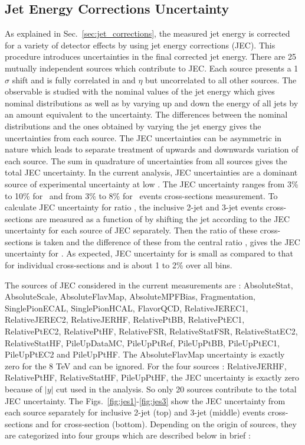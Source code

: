 \subsection{Jet Energy Corrections Uncertainty}
\label{sec:jecs_unc}
As explained in Sec.~\ref{sec:jet_corrections}, the measured jet energy is corrected for a variety of detector effects by using jet energy corrections (JEC). This procedure introduces uncertainties in the final corrected jet energy. There are 25 mutually independent sources which contribute to JEC. Each source presents a 1$\sigma$ shift and is fully correlated in \pt and $\eta$ but uncorrelated to all other sources. The observable is studied with the nominal values of the jet energy which gives nominal distributions as well as by varying up and down the energy of all jets by an amount equivalent to the uncertainty. The differences between the nominal distributions and the ones obtained by varying the jet energy gives the uncertainties from each source. The JEC uncertainties can be asymmetric in nature which leads to separate treatment of upwards and downwards variation of each source. The sum in quadrature of uncertainties from all sources gives the total JEC uncertainty. In the current analysis, JEC uncertainties are a dominant source of experimental uncertainty at low \httwo. The JEC uncertainty ranges from 3\% to 10\% for \njt~and from 3\% to 8\% for \njth~events cross-sections measurement. To calculate JEC uncertainty for ratio \rations, the inclusive 2-jet and 3-jet events cross-sections are measured as a function of \httwo by shifting the jet \pt according to the JEC uncertainty for each source of JEC separately. Then the ratio of these cross-sections is taken and the difference of these from the central ratio \rations, gives the JEC uncertainty for \ratio. As expected, JEC uncertainty for \ratio is small as compared to that for individual cross-sections and is about 1 to 2\% over all \httwo bins.

 The sources of JEC considered in the current measurements are : AbsoluteStat, AbsoluteScale, AbsoluteFlavMap, AbsoluteMPFBias, Fragmentation, SinglePionECAL, SinglePionHCAL, FlavorQCD, RelativeJEREC1, RelativeJEREC2, RelativeJERHF, RelativePtBB, RelativePtEC1, RelativePtEC2, RelativePtHF, RelativeFSR, RelativeStatFSR, RelativeStatEC2, RelativeStatHF, PileUpDataMC, PileUpPtRef, PileUpPtBB, PileUpPtEC1, PileUpPtEC2 and PileUpPtHF. The AbsoluteFlavMap uncertainty is exactly zero for the 8 TeV and can be ignored. For the four sources : RelativeJERHF, RelativePtHF, RelativeStatHF, PileUpPtHF, the JEC uncertainty is exactly zero because of $|y|$  cut used in the analysis. So only 20 sources contribute to the total JEC uncertainty. The Figs.~\ref{fig:jes1}-\ref{fig:jes3} show the JEC uncertainty from each source separately for inclusive 2-jet (top) and 3-jet (middle) events cross-sections and for cross-section \ratio (bottom). Depending on the origin of sources, they are categorized into four groups which are described below in brief :

